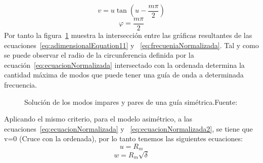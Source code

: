 \documentclass[letterpaper, 10 pt, conference]{ieeeconf}  %
\begin{document}
\begin{equation}
\label{eq:adimensionalEquation11}
v = u\tan (u - \frac{{m\pi }}{2})
\end{equation}
\begin{equation}
\label{eq:cutoff}
\varphi  = \frac{{m\pi }}{2}
\end{equation}
Por tanto la figura~\ref{fig:ModosGuiaSimetrica} muestra la intersecci\'on entre las gr\'aficas resultantes de las ecuaciones~\eqref{eq:adimensionalEquation11} y ~\eqref{eq:frecueniaNormalizada}.
Tal y como se puede observar el radio de la circunferencia definida por la ecuaci\'on~\eqref{eq:ecuacionNormalizada} intersectado con la ordenada determina la cantidad m\'axima de modos que puede tener una gu\'ia de onda a determinada frecuencia. 
\begin{figure}[ht!]
\caption{Soluci\'on de los modos impares y pares de una gu\'ia sim\'etrica.Fuente:
}\label{fig:ModosGuiaSimetrica}
\end{figure}
Aplicando el mismo criterio, para el modelo asim\'etrico, a las ecuaciones~\eqref{eq:ecuacionNormalizada} y ~\eqref{eq:ecuacionNormalizada2}, se tiene que v=0 (Cruce con la ordenada), por lo tanto tenemos las siguientes ecuaciones:
\begin{equation}
\label{eq:RmSolution1}
u = {R_m}
\end{equation}
\begin{equation}
\label{eq:RmSolution2}
w = {R_m}\sqrt \delta
\end{equation}
\end{document}
